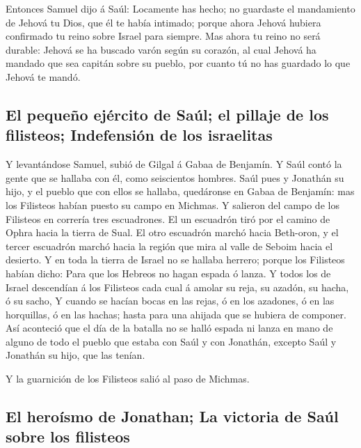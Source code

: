  Entonces Samuel dijo á Saúl: Locamente has hecho; no
guardaste el mandamiento de Jehová tu Dios, que él te había intimado;
porque ahora Jehová hubiera confirmado tu reino sobre Israel para
siempre.  Mas ahora tu reino no será durable: Jehová se ha
buscado varón según su corazón, al cual Jehová ha mandado que sea
capitán sobre su pueblo, por cuanto tú no has guardado lo que Jehová te
mandó.

\hypertarget{el-pequeuxf1o-ejuxe9rcito-de-sauxfal-el-pillaje-de-los-filisteos-indefensiuxf3n-de-los-israelitas}{%
\subsection{El pequeño ejército de Saúl; el pillaje de los filisteos;
Indefensión de los
israelitas}\label{el-pequeuxf1o-ejuxe9rcito-de-sauxfal-el-pillaje-de-los-filisteos-indefensiuxf3n-de-los-israelitas}}

 Y levantándose Samuel, subió de Gilgal á Gabaa de
Benjamín. Y Saúl contó la gente que se hallaba con él, como seiscientos
hombres.  Saúl pues y Jonathán su hijo, y el pueblo que con
ellos se hallaba, quedáronse en Gabaa de Benjamín: mas los Filisteos
habían puesto su campo en Michmas.  Y salieron del campo de
los Filisteos en correría tres escuadrones. El un escuadrón tiró por el
camino de Ophra hacia la tierra de Sual.  El otro escuadrón
marchó hacia Beth-oron, y el tercer escuadrón marchó hacia la región que
mira al valle de Seboim hacia el desierto.  Y en toda la
tierra de Israel no se hallaba herrero; porque los Filisteos habían
dicho: Para que los Hebreos no hagan espada ó lanza.  Y
todos los de Israel descendían á los Filisteos cada cual á amolar su
reja, su azadón, su hacha, ó su sacho,  Y cuando se hacían
bocas en las rejas, ó en los azadones, ó en las horquillas, ó en las
hachas; hasta para una ahijada que se hubiera de componer. 
Así aconteció que el día de la batalla no se halló espada ni lanza en
mano de alguno de todo el pueblo que estaba con Saúl y con Jonathán,
excepto Saúl y Jonathán su hijo, que las tenían.

 Y la guarnición de los Filisteos salió al paso de Michmas.

\hypertarget{el-herouxedsmo-de-jonathan-la-victoria-de-sauxfal-sobre-los-filisteos}{%
\subsection{El heroísmo de Jonathan; La victoria de Saúl sobre los
filisteos}\label{el-herouxedsmo-de-jonathan-la-victoria-de-sauxfal-sobre-los-filisteos}}

